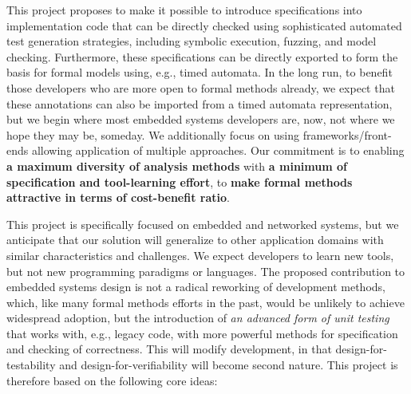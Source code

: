 This project proposes to make it possible to introduce specifications into implementation code that can be directly checked using sophisticated automated test generation strategies, including symbolic execution, fuzzing,  and model checking.   Furthermore, these specifications can be directly exported to form the basis for formal models using, e.g., timed automata.  In the long run, to benefit those developers who are more open to formal methods already, we expect that these annotations can also be imported from a timed automata representation, but we begin where most embedded systems developers are, now, not where we hope they may be, someday.
We additionally focus on using frameworks/front-ends allowing application of multiple approaches.  Our commitment is to enabling \textbf{a maximum diversity of analysis methods} with \textbf{a minimum of specification and tool-learning effort}, to \textbf{make formal methods attractive in terms of cost-benefit ratio}.

This project is specifically focused on embedded and networked systems, but we anticipate that our solution will generalize to other application domains with similar characteristics and challenges.
We expect developers to learn new tools, but not new programming paradigms or languages.  The proposed contribution to embedded systems design is not a radical reworking of development methods, which, like many formal methods efforts in the past, would be unlikely to achieve widespread adoption, but the introduction of \emph{an advanced form of unit testing} that works with, e.g., legacy code, with more powerful methods for specification and checking of correctness. This will modify development, in that design-for-testability and design-for-verifiability will become second nature.  This project is therefore based on the following core ideas:

\noindent{}

